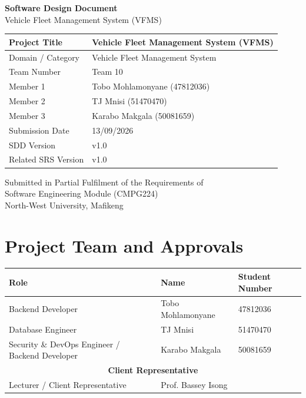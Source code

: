 \documentclass[11pt,a4paper]{article}
\begin{document}
\begin{titlepage}
\centering
\vspace*{2cm}
{\LARGE\bfseries Software Design Document}\\[0.5cm]
{\Large Vehicle Fleet Management System (VFMS)}\\[2cm]

\begin{tabular}{|p{5cm}|p{8cm}|}
\hline
Project Title & Vehicle Fleet Management System (VFMS) \\ \hline
Domain / Category & Vehicle Fleet Management System \\ \hline
Team Number & Team 10 \\ \hline
Member 1 & Tobo Mohlamonyane (47812036) \\ \hline
Member 2 & TJ Mnisi (51470470) \\ \hline
Member 3 & Karabo Makgala (50081659) \\ \hline

Submission Date & 13/09/2026 \\ \hline
SDD Version & v1.0 \\ \hline
Related SRS Version & v1.0 \\ \hline
\end{tabular}

\vspace{2cm}
Submitted in Partial Fulfilment of the Requirements of\\
Software Engineering Module (CMPG224)\\
North-West University, Mafikeng
\end{titlepage}

\section*{Project Team and Approvals}

\begin{table}[H]
\centering
\begin{tabularx}{\textwidth}{|X|X|X|}
\hline
\textbf{Role} & \textbf{Name} & \textbf{Student Number} \\
\hline
Backend Developer & Tobo Mohlamonyane & 47812036 \\
\hline
Database Engineer & TJ Mnisi & 51470470 \\
\hline
Security \& DevOps Engineer / Backend Developer & Karabo Makgala & 50081659 \\
\hline
\multicolumn{3}{|c|}{\textbf{Client Representative}} \\
\hline
Lecturer / Client Representative & Prof. Bassey Isong &  \\
\hline
\end{tabularx}
\end{table}
\end{document}

